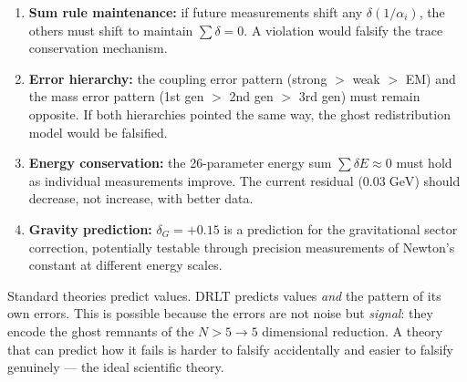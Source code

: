 \begin{enumerate}
\item \textbf{Sum rule maintenance:} if future measurements shift any $\delta(1/\alpha_i)$, the others must shift to maintain $\sum \delta = 0$. A violation would falsify the trace conservation mechanism.

\item \textbf{Error hierarchy:} the coupling error pattern (strong $>$ weak $>$ EM) and the mass error pattern (1st gen $>$ 2nd gen $>$ 3rd gen) must remain opposite. If both hierarchies pointed the same way, the ghost redistribution model would be falsified.

\item \textbf{Energy conservation:} the 26-parameter energy sum $\sum \delta E \approx 0$ must hold as individual measurements improve. The current residual ($0.03\;\text{GeV}$) should decrease, not increase, with better data.

\item \textbf{Gravity prediction:} $\delta_G = +0.15$ is a prediction for the gravitational sector correction, potentially testable through precision measurements of Newton's constant at different energy scales.
\end{enumerate}

\begin{remark}
Standard theories predict values. DRLT predicts values \emph{and} the pattern of its own errors. This is possible because the errors are not noise but \emph{signal}: they encode the ghost remnants of the $N > 5 \to 5$ dimensional reduction. A theory that can predict how it fails is harder to falsify accidentally and easier to falsify genuinely --- the ideal scientific theory.
\end{remark}
